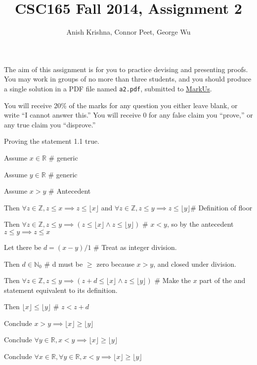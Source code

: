 \documentclass{article}
\title{CSC165 Fall 2014, Assignment 2}
\author{Anish Krishna, Connor Peet, George Wu}
\newcommand{\floor}[1]{\lfloor #1\rfloor}
\begin{document}
\maketitle
\noindent
The aim of this assignment is for you to practice devising and
presenting proofs.  You may work in groups of no more than three
students, and you should produce a single solution in a PDF file named
\texttt{a2.pdf}, submitted to
\href{https://markus.cdf.toronto.edu/csc165-2014-09}{MarkUs}.

You will receive 20\% of the marks for any question you either leave
blank, or write ``I cannot answer this.''  You will receive 0 for any
false claim you ``prove,'' or any true claim you ``disprove.''

\begin{enumerate}
\item Proving the statement 1.1 true.  %
    \begin{description}
    \item Assume $x \in \mathbb{R}$ \# generic
        \begin{description}
        \item Assume $y \in \mathbb{R}$ \# generic
            \begin{description}
            \item Assume $x > y$ \# Antecedent
                \begin{description}
                \item Then $\forall z \in \mathbb{Z}, z \leq x \implies z \leq \floor{x}$ and $\forall z \in \mathbb{Z}, z \leq y \implies z \leq \floor{y}$\# Definition of floor
                \item Then $\forall z \in \mathbb{Z}, z \leq y \implies (z \leq \floor{x} \land z \leq \floor{y})$ \# $x < y$, so by the antecedent $z \leq y \implies z \leq x$
                \item Let there be $d = (x - y) / 1$ \# Treat as integer division.
                \item Then $d \in \mathbb{N}_0$ \# d must be $\geq$ zero because $x > y$, and closed under division.
                \item Then $\forall z \in \mathbb{Z}, z \leq y \implies (z + d \leq \floor{x} \land z \leq \floor{y})$ \# Make the $x$ part of the and statement equivalent to its definition.
                \item Then $\floor{x} \leq \floor{y}$ \# $z < z + d$
                \end{description}
            \item Conclude $x > y \implies \floor{x} \geq \floor{y}$
            \end{description}
        \item Conclude $\forall y \in \mathbb{R}, x < y \implies \floor{x} \geq \floor{y}$
        \end{description}
    \item Conclude $\forall x \in \mathbb{R}, \forall y \in \mathbb{R}, x < y \implies \floor{x} \geq \floor{y}$
    \end{description}


\end{enumerate}
\end{document}
